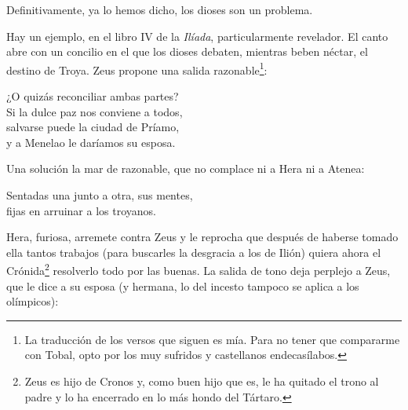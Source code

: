 \label{cap:calipso}

Definitivamente, ya lo hemos dicho, los dioses son un problema.


Hay un ejemplo, en el libro IV de la \emph{Ilíada}, particularmente revelador. El canto abre con un concilio en el que los dioses debaten, mientras beben néctar, el destino de Troya. Zeus propone una salida razonable\footnote{La traducción de los versos que siguen es mía. Para no tener que compararme con Tobal, opto por los muy sufridos y castellanos endecasílabos.}:

\begin{versocita}
¿O quizás reconciliar ambas partes?\\
Si la dulce paz nos conviene a todos,\\
salvarse puede la ciudad de Príamo,\\
y a Menelao le daríamos su esposa.
\end{versocita}

Una solución la mar de razonable, que no complace ni a Hera ni a Atenea:

\begin{versocita}
Sentadas una junto a otra, sus mentes,\\
fijas en arruinar a los troyanos.
\end{versocita}

Hera, furiosa, arremete contra Zeus y le reprocha que después de haberse tomado ella tantos trabajos (para buscarles la desgracia a los de Ilión) quiera ahora el Crónida\footnote{Zeus es hijo de Cronos y, como buen hijo que es, le ha quitado el trono al padre y lo ha encerrado en lo más hondo del Tártaro.} resolverlo todo por las buenas. La salida de tono deja perplejo a Zeus, que le dice a su esposa (y hermana, lo del incesto tampoco se aplica a los olímpicos):

